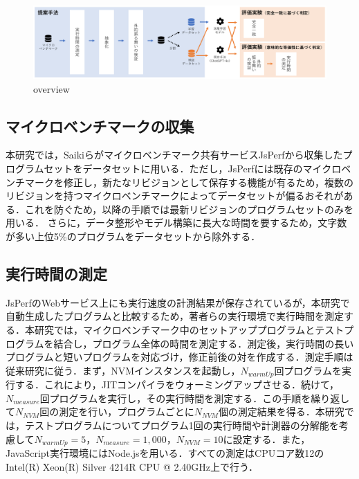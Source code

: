 \documentclass[submit,techrep,noauthor]{ipsj}
\newcommand{\todo}[1]{\colorbox{yellow}{{\bf TODO}:}{\color{red} {\textbf{[#1]}}}}
\begin{document}
\begin{figure}[t]
\centerline{\includegraphics[width=0.9\linewidth]{Omori_fig/overview.pdf}}
\caption{overview}
\label{fig-overview}
\end{figure}


\subsection{マイクロベンチマークの収集}
本研究では，Saikiら\cite{Saiki_2021}がマイクロベンチマーク共有サービスJsPerfから収集したプログラムセットをデータセットに用いる．ただし，JsPerfには既存のマイクロベンチマークを修正し，新たなリビジョンとして保存する機能が有るため，複数のリビジョンを持つマイクロベンチマークによってデータセットが偏るおそれがある．これを防ぐため，以降の手順では最新リビジョンのプログラムセットのみを用いる．
さらに，データ整形やモデル構築に長大な時間を要するため，文字数が多い上位5\%のプログラムをデータセットから除外する．

\subsection{実行時間の測定}\label{subsec:measureTime}

JsPerfのWebサービス上にも実行速度の計測結果が保存されているが，本研究で自動生成したプログラムと比較するため，著者らの実行環境で実行時間を測定する．本研究では，マイクロベンチマーク中のセットアッププログラムとテストプログラムを結合し，プログラム全体の時間を測定する．測定後，実行時間の長いプログラムと短いプログラムを対応づけ，修正前後の対を作成する．測定手順は従来研究\cite{Selakovic_2016}に従う．まず，NVMインスタンスを起動し，\begin{math}N_{warmUp}\end{math}回プログラムを実行する．これにより，JITコンパイラをウォーミングアップさせる．続けて，\begin{math}N_{measure}\end{math}回プログラムを実行し，その実行時間を測定する．この手順を繰り返して\begin{math}N_{NVM}\end{math}回の測定を行い，プログラムごとに\begin{math}N_{NVM}\end{math}個の測定結果を得る．本研究では，テストプログラムについてプログラム1回の実行時間や計測器の分解能を考慮して\begin{math}N_{warmUp}=5\end{math}，\begin{math}N_{measure}=1,000\end{math}，\begin{math}N_{NVM}=10\end{math}に設定する．また，JavaScript実行環境にはNode.jsを用いる．すべての測定はCPUコア数12のIntel(R) Xeon(R) Silver 4214R CPU @ 2.40GHz上で行う．
\end{document}
